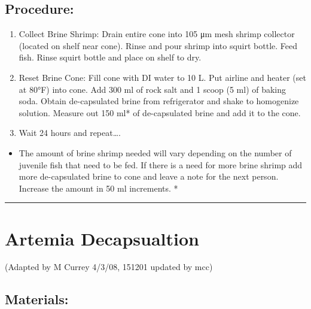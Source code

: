 \documentclass[
]{book}
\providecommand{\tightlist}{%
  \setlength{\itemsep}{0pt}\setlength{\parskip}{0pt}}
\begin{document}
\hypertarget{procedure-4}{%
\subsection{Procedure:}\label{procedure-4}}

\begin{enumerate}
\def\labelenumi{\arabic{enumi}.}
\tightlist
\item
  Collect Brine Shrimp: Drain entire cone into 105 μm mesh shrimp collector (located on shelf near cone). Rinse and pour shrimp into squirt bottle. Feed fish. Rinse squirt bottle and place on shelf to dry.
\item
  Reset Brine Cone: Fill cone with DI water to 10 L. Put airline and heater (set at 80°F) into cone. Add 300 ml of rock salt and 1 scoop (5 ml) of baking soda. Obtain de-capsulated brine from refrigerator and shake to homogenize solution. Measure out 150 ml* of de-capsulated brine and add it to the cone.
\item
  Wait 24 hours and repeat\ldots.
\end{enumerate}

\begin{itemize}
\tightlist
\item
  The amount of brine shrimp needed will vary depending on the number of juvenile fish that need to be fed. If there is a need for more brine shrimp add more de-capsulated brine to cone and leave a note for the next person. Increase the amount in 50 ml increments. *
\end{itemize}

\begin{center}\rule{0.5\linewidth}{0.5pt}\end{center}

\hypertarget{artemia-decapsualtion}{%
\section{Artemia Decapsualtion}\label{artemia-decapsualtion}}

(Adapted by M Currey 4/3/08, 151201 updated by mcc)

\hypertarget{materials-2}{%
\subsection{Materials:}\label{materials-2}}
\end{document}
